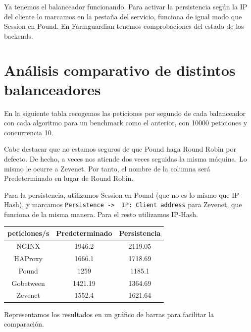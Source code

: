 \documentclass{article}
\begin{document}
Ya tenemos el balanceador funcionando. Para activar la persistencia según la IP del cliente lo marcamos en la
pestaña del servicio, funciona de igual modo que Session en Pound. En Farmguardian tenemos comprobaciones del estado
de los backends.

\section{Análisis comparativo de distintos balanceadores}

En la siguiente tabla recogemos las peticiones por segundo de cada balanceador con cada algoritmo para un benchmark
como el anterior, con 10000 peticiones y concurrencia 10.

Cabe destacar que no estamos seguros de que Pound haga Round Robin por defecto. De hecho, a veces nos atiende dos veces seguidas la misma máquina. Lo mismo le ocurre a Zevenet.
 Por tanto, el nombre de la columna será Predeterminado en lugar de Round Robin.

Para la persistencia, utilizamos Session en Pound (que no es lo mismo que IP-Hash), y marcamos
\texttt{Persistence -> \ IP: Client address} para Zevenet, que funciona de la misma manera.
Para el resto utilizamos IP-Hash.

\begin{table}[H]
	\centering
	\begin{tabular}{|c|c|c|}
		\hline
		\multicolumn{1}{|l|}{peticiones/s} & \multicolumn{1}{l|}{Predeterminado} & \multicolumn{1}{l|}{Persistencia} \\ \hline
		NGINX                              & 1946.2                           & 2119.05                                \\ \hline
		HAProxy                            & 1666.1                           & 1718.69                                \\ \hline
		Pound                              & 1259                             & 1185.1                                 \\ \hline
		Gobetween                          & 1421.19                  & 1364.69                                \\ \hline
		Zevenet                            & 1552.4                  & 1621.64                              \\ \hline
	\end{tabular}
\end{table}

Representamos los resultados en un gráfico de barras para facilitar la comparación.
\end{document}
